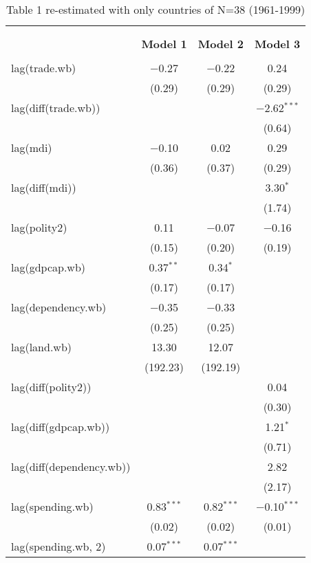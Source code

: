 
\begin{table}[!htbp] \centering 
  \caption{Table 1 re-estimated with only countries of N=38 (1961-1999)} 
  \label{} 
\footnotesize 
\begin{tabular}{@{\extracolsep{5pt}}lccc} 
\\[-1.8ex]\hline \\[-1.8ex] 
\\[-1.8ex] & \textbf{Model 1} & \textbf{Model 2} & \textbf{Model 3}\\ 
\hline \\[-1.8ex] 
 lag(trade.wb) & $-$0.27 & $-$0.22 & 0.24 \\ 
  & (0.29) & (0.29) & (0.29) \\ 
  lag(diff(trade.wb)) &  &  & $-$2.62$^{***}$ \\ 
  &  &  & (0.64) \\ 
  lag(mdi) & $-$0.10 & 0.02 & 0.29 \\ 
  & (0.36) & (0.37) & (0.29) \\ 
  lag(diff(mdi)) &  &  & 3.30$^{*}$ \\ 
  &  &  & (1.74) \\ 
  lag(polity2) & 0.11 & $-$0.07 & $-$0.16 \\ 
  & (0.15) & (0.20) & (0.19) \\ 
  lag(gdpcap.wb) & 0.37$^{**}$ & 0.34$^{*}$ &  \\ 
  & (0.17) & (0.17) &  \\ 
  lag(dependency.wb) & $-$0.35 & $-$0.33 &  \\ 
  & (0.25) & (0.25) &  \\ 
  lag(land.wb) & 13.30 & 12.07 &  \\ 
  & (192.23) & (192.19) &  \\ 
  lag(diff(polity2)) &  &  & 0.04 \\ 
  &  &  & (0.30) \\ 
  lag(diff(gdpcap.wb)) &  &  & 1.21$^{*}$ \\ 
  &  &  & (0.71) \\ 
  lag(diff(dependency.wb)) &  &  & 2.82 \\ 
  &  &  & (2.17) \\ 
  lag(spending.wb) & 0.83$^{***}$ & 0.82$^{***}$ & $-$0.10$^{***}$ \\ 
  & (0.02) & (0.02) & (0.01) \\ 
  lag(spending.wb, 2) & 0.07$^{***}$ & 0.07$^{***}$ &  \\ 

\end{tabular}
\end{table}
